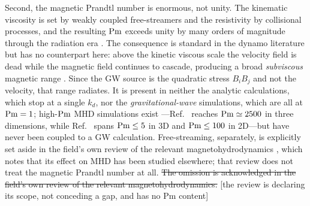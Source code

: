 \documentclass[10pt,prd,aps,nobibnotes,superscriptaddress,preprintnumbers,notitlepage]{revtex4-1}
\newcommand{\add}[1]{{\color{red}#1}}
\newcommand{\del}[1]{{\color{red}\sout{#1}}}
\newcommand{\why}[1]{{\color{red}\footnotesize\textsf{[#1]}}}
\newcommand{\add}[1]{#1}
\newcommand{\del}[1]{}
\newcommand{\why}[1]{}
\begin{document}
Second, the magnetic Prandtl number is enormous, not unity. The kinematic viscosity
is set by weakly coupled free-streamers and the resistivity by collisional
processes, and the resulting ${\rm Pm}$ exceeds unity by many orders of magnitude
through the radiation era \cite{Banerjee:2004df,Durrer:2013pga}. The consequence is standard
in the dynamo literature but has no counterpart here: above the kinetic viscous
scale the velocity field is dead while the magnetic field continues to cascade,
producing a broad \emph{subviscous} magnetic range
\cite{Kulsrud:1992rk,Schekochihin:2002xf,Schekochihin:2003bg,Schekochihin:2020aqu}. Since
the GW source is the quadratic stress $B_iB_j$ and not the velocity, that range
radiates. It is present in neither the analytic calculations, which stop at a single
$k_d$, nor the \emph{gravitational-wave} simulations, which are all at
${\rm Pm}=1$; high-${\rm Pm}$ MHD simulations exist
\add{---Ref.~\cite{Schekochihin:2003bg} reaches ${\rm Pm}\simeq2500$ in three
dimensions, while Ref.~\cite{Brandenburg:2024tyi} spans ${\rm Pm}\le5$ in 3D and
${\rm Pm}\le100$ in 2D---}but have never been coupled to a GW calculation.
\add{Free-streaming, separately, is explicitly set aside in the field's own review of
the relevant magnetohydrodynamics \cite{RoperPol:2025lgc}, which notes that its effect
on MHD has been studied elsewhere; that review does not treat the magnetic Prandtl
number at all.}
\del{The omission is acknowledged in the field's own review of the relevant
magnetohydrodynamics.}
\why{the review is declaring its scope, not conceding a gap, and has no Pm content}
\end{document}
